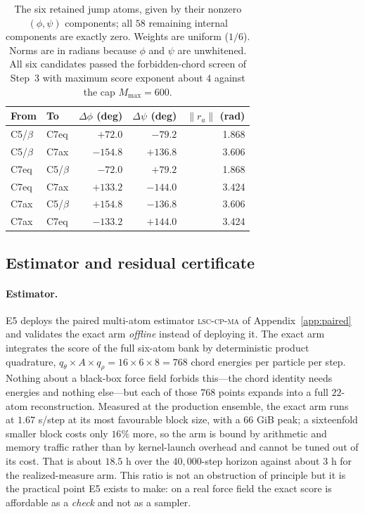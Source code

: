 \documentclass[11pt]{article}
\begin{document}
\begin{table}[!ht]
\centering
\small
\setlength{\tabcolsep}{6pt}
\begin{tabular}{llrrr}
\toprule
From & To & $\Delta\phi$ (deg) & $\Delta\psi$ (deg) & $\lVert r_a\rVert$ (rad)\\
\midrule
C5/$\beta$ & C7eq      & $+72.0$  & $-79.2$  & 1.868\\
C5/$\beta$ & C7ax      & $-154.8$ & $+136.8$ & 3.606\\
C7eq       & C5/$\beta$ & $-72.0$  & $+79.2$  & 1.868\\
C7eq       & C7ax      & $+133.2$ & $-144.0$ & 3.424\\
C7ax       & C5/$\beta$ & $+154.8$ & $-136.8$ & 3.606\\
C7ax       & C7eq      & $-133.2$ & $+144.0$ & 3.424\\
\bottomrule
\end{tabular}
\caption{The six retained jump atoms, given by their nonzero
$(\phi,\psi)$ components; all $58$ remaining internal components are exactly
zero.  Weights are uniform ($1/6$).  Norms are in radians because $\phi$ and
$\psi$ are unwhitened.  All six candidates passed the forbidden-chord screen of
Step~3 with maximum score exponent about $4$ against the cap $M_{\max}=600$.}
\label{tab:e5-bank}
\end{table}

\subsection{Estimator and residual certificate}
\label{app:e5-certificate}

\paragraph{Estimator.}
E5 deploys the paired multi-atom estimator \textsc{lsc-cp-ma} of
Appendix~\ref{app:paired} and validates the exact arm \emph{offline} instead of
deploying it.  The exact arm integrates the score of the full six-atom bank by
deterministic product quadrature, $q_\theta\times A\times q_\rho
=16\times6\times8=768$ chord energies per particle per step.  Nothing about a
black-box force field forbids this---the chord identity needs energies and
nothing else---but each of those $768$ points expands into a full $22$-atom
reconstruction.  Measured at the production ensemble, the exact arm runs at
$1.67$ s/step at its most favourable block size, with a $66$ GiB peak; a
sixteenfold smaller block costs only $16\%$ more, so the arm is bound by
arithmetic and memory traffic rather than by kernel-launch overhead and cannot
be tuned out of its cost.  That is about $18.5$ h over the $40{,}000$-step
horizon against about $3$ h for the realized-measure arm.  This ratio is not an
obstruction of principle but it is the practical point E5 exists to make: on a
real force field the exact score is affordable as a \emph{check} and not as a
sampler.
\end{document}
